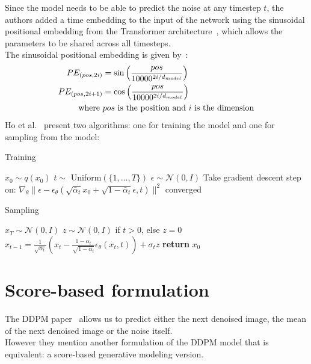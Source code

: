 \documentclass{article}
\numberwithin{equation}{section}
\numberwithin{figure}{section}
\begin{document}
Since the model needs to be able to predict the noise at any timestep $t$, the authors added a time embedding to the input of the network using the sinusoidal positional embedding from the Transformer architecture~\cite{vaswani2023attention}, which allows the parameters to be shared across all timesteps. \\
The sinusoidal positional embedding is given by~\cite{vaswani2023attention}:
\begin{align}
  PE_{(pos, 2i)} &= \sin \left( \frac{pos}{10000^{2i/d_{model}}} \right) \\
  PE_{(pos, 2i+1)} &= \cos \left( \frac{pos}{10000^{2i/d_{model}}} \right) \\
  \text{where } & pos \text{ is the position and } i \text{ is the dimension} \notag
\end{align}
Ho et al.~\cite{ho2020denoising} present two algorithms: one for training the model and one for sampling from the model:
\\
\begin{algorithm}[H]
  \centering
  \caption{Training}\label{alg:training}
  \begin{algorithmic}[1]
    \Repeat
    \State $x_0 \sim q(x_0)$ 
    \State $t \sim$ Uniform$(\{1,\ldots, T\})$
    \State $\epsilon \sim \mathcal{N}(0, I)$
    \State Take gradient descent step on:
    \State \quad $\nabla_\theta \| \epsilon - \epsilon_\theta \left( \sqrt{\bar{\alpha}_t} x_0 + \sqrt{1 - \bar{\alpha}_t} \epsilon, t \right) \|^2$
    \Until converged
  \end{algorithmic}
\end{algorithm}
\begin{algorithm}[H]
  \centering
  \caption{Sampling}\label{alg:sampling}
  \begin{algorithmic}[1]
    \State $x_T \sim \mathcal{N}(0, I)$
      \State $z \sim \mathcal{N}(0, I)$ if $t > 0$, else $z = 0$
      \State $x_{t-1} = \frac{1}{\sqrt{\alpha_t}} \left( x_t - \frac{1 - \alpha_t}{\sqrt{1 - \bar{\alpha_t}}} \epsilon_\theta (x_t, t) \right) + \sigma_t z $
    \EndFor
    \State \textbf{return} $x_0$
  \end{algorithmic}
\end{algorithm}

\newpage
\section{Score-based formulation}
The DDPM paper~\cite{ho2020denoising} allows us to predict either the next denoised image, the mean of the next denoised image or the noise itself. \\
However they mention another formulation of the DDPM model that is equivalent: a score-based generative modeling version.
\end{document}
